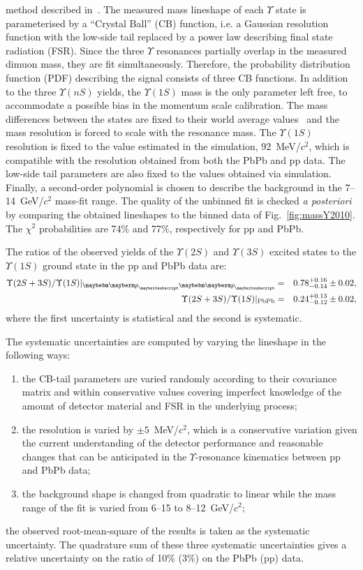 method described in~\cite{Khachatryan:2010zg}. The measured mass lineshape of each $\Upsilon$ state is parameterised by a ``Crystal Ball'' (CB) function, i.e. 
a Gaussian resolution function with the low-side tail replaced by a power law describing final state radiation (FSR). Since the three $\Upsilon$ resonances partially 
overlap in the measured dimuon mass, they are fit simultaneously. Therefore, the probability distribution function (PDF) describing the signal consists of three CB 
functions. In addition to the three $\Upsilon(nS)$ yields, the $\Upsilon(1S)$ mass is the only parameter left free, to accommodate a possible bias in the momentum 
scale calibration. The mass differences between the states are fixed to their world average values~\cite{Nakamura:2010zzi} and the mass resolution is forced to scale 
with the resonance mass. The $\Upsilon(1S)$ resolution is fixed to the value estimated in the simulation, 92~MeV/$c^2$, which is compatible with the resolution obtained 
from both the PbPb and pp data. The low-side tail parameters are also fixed to the values obtained via simulation. Finally, a second-order polynomial is chosen to 
describe the background in the 7--14~GeV/$c^2$ mass-fit range.
The quality of the unbinned fit is checked \emph{a posteriori} by comparing the obtained lineshapes to the binned data of Fig.~\ref{fig:massY2010}. 
The $\chi^2$ probabilities are 74$\%$ and 77$\%$, respectively for pp and PbPb.

The ratios of the observed yields of the $\Upsilon(2S)$ and $\Upsilon(3S)$ excited states to the $\Upsilon(1S)$ ground state in the pp and PbPb data are:
\begin{eqnarray}
  \Upsilon(2S+3S)/\Upsilon(1S)|_{\Pp\Pp} & = & 0.78 _{-0.14}^{+0.16} \pm 0.02,\\
  \Upsilon(2S+3S)/\Upsilon(1S)|_{\rm PbPb} & = & 0.24 _{-0.12}^{+0.13} \pm 0.02,
\end{eqnarray}
where the first uncertainty is statistical and the second is systematic.

The systematic uncertainties are computed by varying the lineshape in the following ways: 
\begin{enumerate}
\item the CB-tail parameters are varied randomly according to their covariance matrix and within conservative values covering imperfect 
knowledge of the amount of detector material and FSR in the underlying process; 

\item the resolution is varied by $\pm 5$~MeV/$c^2$, which is a conservative variation given the current understanding of the detector performance 
and reasonable changes that can be anticipated in the $\Upsilon$-resonance kinematics between pp and PbPb data; 

\item the background shape is changed from quadratic to linear while the mass range of the fit is varied from 6--15 to 8--12~GeV/$c^2$; 
\end{enumerate}
the observed root-mean-square of the results is taken as the systematic uncertainty. The quadrature sum of these three systematic uncertainties 
gives a relative uncertainty on the ratio of 10$\%$ (3$\%$) on the PbPb (pp) data.

